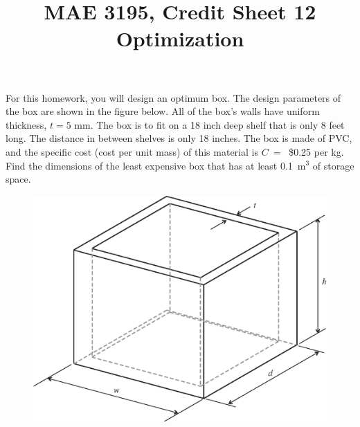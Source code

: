 \documentclass[12pt]{article}
\title{MAE 3195, Credit Sheet 12\\
Optimization}
\date{}
\begin{document}
\maketitle

For this homework, you will design an optimum box. The design parameters of the box are shown in the figure below. All of the box's walls have uniform thickness, $t = 5$ mm. The box is to fit on a 18 inch deep shelf that is only 8 feet long. The distance in between shelves is only 18 inches. The box is made of PVC, and the specific cost (cost per unit mass) of this material is $C$~= ~\$0.25 per kg. Find the dimensions of the least expensive box that has at least 0.1~m$^3$ of storage space.

\begin{figure}[htp]
  \begin{center}
    \includegraphics[width=6.in]{box_CS12}
    \label{figBox}
  \end{center}
\end{figure}


\pagebreak
\end{document}
